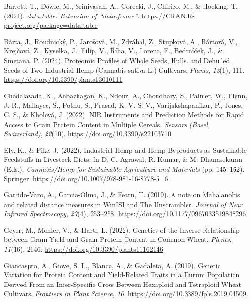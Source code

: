 \documentclass[
]{agujournal2019}
\newlength{\cslhangindent}
\newenvironment{CSLReferences}[2] %
 {\begin{list}{}{%
  \setlength{\itemindent}{0pt}
  \setlength{\leftmargin}{0pt}
  \setlength{\parsep}{0pt}
  \ifodd #1
   \setlength{\leftmargin}{\cslhangindent}
   \setlength{\itemindent}{-1\cslhangindent}
  \fi
  \setlength{\itemsep}{#2\baselineskip}}}
 {\end{list}}
\begin{document}
\label{refs}
\begin{CSLReferences}{1}{0}
\vspace{1em}

Barrett, T., Dowle, M., Srinivasan, A., Gorecki, J., Chirico, M., \&
Hocking, T. (2024). \emph{{data.table}: Extension of
{``{data.frame}''}}. \url{https://CRAN.R-project.org/package=data.table}

Bárta, J., Roudnický, P., Jarošová, M., Zdráhal, Z., Stupková, A.,
Bártová, V., Krejčová, Z., Kyselka, J., Filip, V., Říha, V., Lorenc, F.,
Bedrníček, J., \& Smetana, P. (2024). Proteomic {Profiles} of {Whole}
{Seeds}, {Hulls}, and {Dehulled} {Seeds} of {Two} {Industrial} {Hemp}
({Cannabis} sativa {L}.) {Cultivars}. \emph{Plants}, \emph{13}(1), 111.
\url{https://doi.org/10.3390/plants13010111}

Chadalavada, K., Anbazhagan, K., Ndour, A., Choudhary, S., Palmer, W.,
Flynn, J. R., Mallayee, S., Pothu, S., Prasad, K. V. S. V.,
Varijakshapanikar, P., Jones, C. S., \& Kholová, J. (2022). {NIR}
{Instruments} and {Prediction} {Methods} for {Rapid} {Access} to {Grain}
{Protein} {Content} in {Multiple} {Cereals}. \emph{Sensors (Basel,
Switzerland)}, \emph{22}(10). \url{https://doi.org/10.3390/s22103710}

Ely, K., \& Fike, J. (2022). Industrial {Hemp} and {Hemp} {Byproducts}
as {Sustainable} {Feedstuffs} in {Livestock} {Diets}. In D. C. Agrawal,
R. Kumar, \& M. Dhanasekaran (Eds.), \emph{Cannabis/{Hemp} for
{Sustainable} {Agriculture} and {Materials}} (pp. 145--162). Springer.
\url{https://doi.org/10.1007/978-981-16-8778-5_6}

Garrido-Varo, A., Garcia-Olmo, J., \& Fearn, T. (2019). A note on
{Mahalanobis} and related distance measures in {WinISI} and {The}
{Unscrambler}. \emph{Journal of Near Infrared Spectroscopy},
\emph{27}(4), 253--258. \url{https://doi.org/10.1177/0967033519848296}

Geyer, M., Mohler, V., \& Hartl, L. (2022). Genetics of the {Inverse}
{Relationship} between {Grain} {Yield} and {Grain} {Protein} {Content}
in {Common} {Wheat}. \emph{Plants}, \emph{11}(16), 2146.
\url{https://doi.org/10.3390/plants11162146}

Giancaspro, A., Giove, S. L., Blanco, A., \& Gadaleta, A. (2019).
Genetic {Variation} for {Protein} {Content} and {Yield}-{Related}
{Traits} in a {Durum} {Population} {Derived} {From} an
{Inter}-{Specific} {Cross} {Between} {Hexaploid} and {Tetraploid}
{Wheat} {Cultivars}. \emph{Frontiers in Plant Science}, \emph{10}.
\url{https://doi.org/10.3389/fpls.2019.01509}


\end{CSLReferences}
\end{document}
